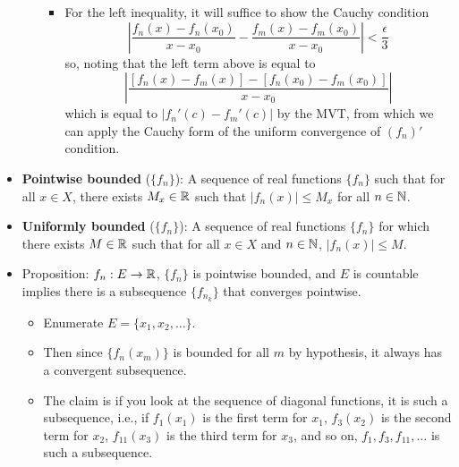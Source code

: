 \documentclass[../notes.tex]{subfiles}
\begin{document}
\begin{itemize}
\begin{itemize}
\begin{itemize}
            \item For the left inequality, it will suffice to show the Cauchy condition
            \begin{equation*}
                \left| \frac{f_n(x)-f_n(x_0)}{x-x_0}-\frac{f_m(x)-f_m(x_0)}{x-x_0} \right| < \frac{\epsilon}{3}
            \end{equation*}
            so, noting that the left term above is equal to
            \begin{equation*}
                \left| \frac{[f_n(x)-f_m(x)]-[f_n(x_0)-f_m(x_0)]}{x-x_0} \right|
            \end{equation*}
            which is equal to $|f_n'(c)-f_m'(c)|$ by the MVT, from which we can apply the Cauchy form of the uniform convergence of $(f_n)'$ condition.
        \end{itemize}
    \end{itemize}
    \item \textbf{Pointwise bounded} ($\{f_n\}$): A sequence of real functions $\{f_n\}$ such that for all $x\in X$, there exists $M_x\in\mathbb{R}$ such that $|f_n(x)|\leq M_x$ for all $n\in\mathbb{N}$.
    \item \textbf{Uniformly bounded} ($\{f_n\}$): A sequence of real functions $\{f_n\}$ for which there exists $M\in\mathbb{R}$ such that for all $x\in X$ and $n\in\mathbb{N}$, $|f_n(x)|\leq M$.
    \item Proposition: $f_n:E\to\mathbb{R}$, $\{f_n\}$ is pointwise bounded, and $E$ is countable implies there is a subsequence $\{f_{n_k}\}$ that converges pointwise.
    \begin{itemize}
        \item Enumerate $E=\{x_1,x_2,\dots\}$.
        \item Then since $\{f_n(x_m)\}$ is bounded for all $m$ by hypothesis, it always has a convergent subsequence.
        \item The claim is if you look at the sequence of diagonal functions, it is such a subsequence, i.e., if $f_1(x_1)$ is the first term for $x_1$, $f_3(x_2)$ is the second term for $x_2$, $f_{11}(x_3)$ is the third term for $x_3$, and so on, $f_1,f_3,f_{11},\dots$ is such a subsequence.
    \end{itemize}
\end{itemize}
\end{document}
